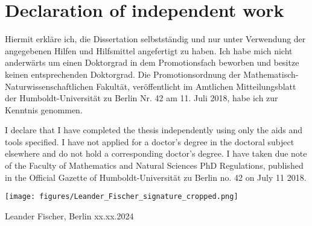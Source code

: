 \chapter*{Declaration of independent work}

Hiermit erkläre ich, die Dissertation selbstständig und nur unter Verwendung der angegebenen Hilfen und Hilfsmittel angefertigt zu haben. Ich habe mich nicht anderwärts um einen Doktorgrad in dem Promotionsfach beworben und besitze keinen entsprechenden Doktorgrad. Die Promotionsordnung der Mathematisch-Naturwissenschaftlichen Fakultät, veröffentlicht im Amtlichen Mitteilungsblatt der Humboldt-Universität zu Berlin Nr. 42 am 11. Juli 2018, habe ich zur Kenntnis genommen.

I declare that I have completed the thesis independently using only the aids and tools specified. I have not applied for a doctor's degree in the doctoral subject elsewhere and do not hold a corresponding doctor's degree. I have taken due note of the Faculty of Mathematics and Natural Sciences PhD Regulations, published in the Official Gazette of Humboldt-Universität zu Berlin no. 42 on July 11 2018.

\vspace{1cm}
\texttt{[image: figures/Leander\_Fischer\_signature\_cropped.png]}

Leander Fischer, Berlin xx.xx.2024